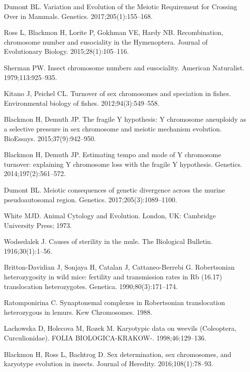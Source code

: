 \documentclass[]{rsos}%
\begin{document}
\begin{thebibliography}{9}
Dumont BL.
 Variation and Evolution of the Meiotic Requirement for Crossing Over
  in Mammals.
 Genetics. 2017;205(1):155--168.

Ross L, Blackmon H, Lorite P, Gokhman VE, Hardy NB.
 Recombination, chromosome number and eusociality in the
  {H}ymenoptera.
 Journal of Evolutionary Biology. 2015;28(1):105--116.

Sherman PW.
 Insect chromosome numbers and eusociality.
 American Naturalist. 1979;113:925--935.

Kitano J, Peichel CL.
 Turnover of sex chromosomes and speciation in fishes.
 Environmental biology of fishes. 2012;94(3):549--558.

Blackmon H, Demuth JP.
 The fragile Y hypothesis: Y chromosome aneuploidy as a selective
  pressure in sex chromosome and meiotic mechanism evolution.
 BioEssays. 2015;37(9):942--950.

Blackmon H, Demuth JP.
 Estimating tempo and mode of Y chromosome turnover: explaining Y
  chromosome loss with the fragile Y hypothesis.
 Genetics. 2014;197(2):561--572.

Dumont BL.
 Meiotic consequences of genetic divergence across the murine
  pseudoautosomal region.
 Genetics. 2017;205(3):1089--1100.

White MJD.
 Animal Cytology and Evolution.
 London, UK: Cambridge University Press; 1973.

Wodsedalek J.
 Causes of sterility in the mule.
 The Biological Bulletin. 1916;30(1):1--56.

Britton-Davidian J, Sonjaya H, Catalan J, Cattaneo-Berrebi G.
 Robertsonian heterozygosity in wild mice: fertility and transmission
  rates in Rb (16.17) translocation heterozygotes.
 Genetica. 1990;80(3):171--174.

Ratomponirina C.
 Synaptonemal complexes in Robertsonian translocation heterozygous in
  lemurs.
 Kew Chromosomes. 1988.

Lachowska D, Holecova M, Rozek M.
 Karyotypic data on weevils (Coleoptera, Curculionidae).
 FOLIA BIOLOGICA-KRAKOW-. 1998;46:129--136.

Blackmon H, Ross L, Bachtrog D.
 Sex determination, sex chromosomes, and karyotype evolution in
  insects.
 Journal of Heredity. 2016;108(1):78--93.


\end{thebibliography}
\end{document}
